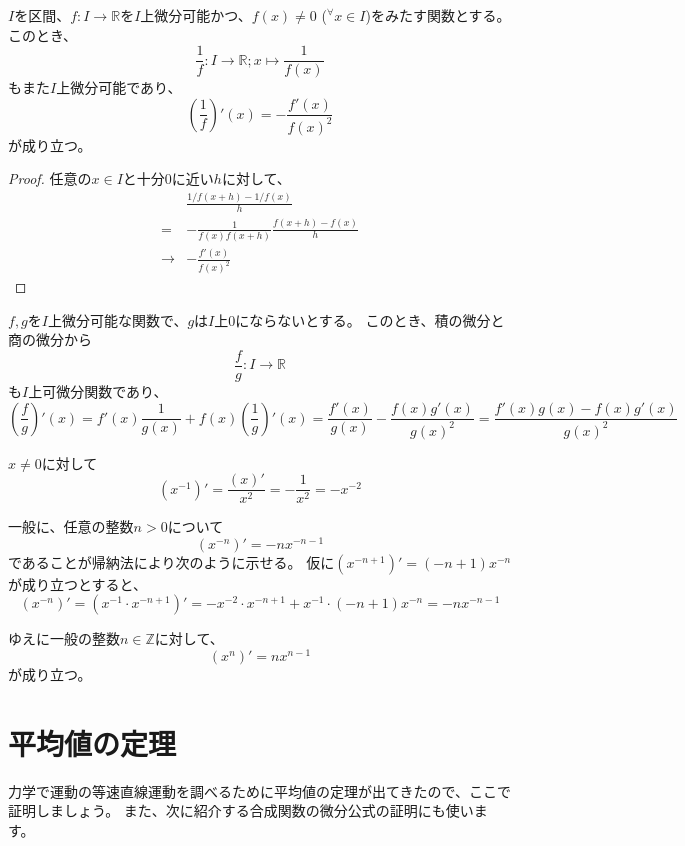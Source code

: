 \begin{theorem}
  $I$を区間、$f:I\to\mathbb{R}$を$I$上微分可能かつ、$f(x)\neq0$ (${}^\forall x\in I$)をみたす関数とする。
  このとき、
  \[
    \frac{1}{f}:I\to\mathbb{R};x\mapsto\frac{1}{f(x)}
  \]
  もまた$I$上微分可能であり、
  \[
    \left(\frac{1}{f}\right)'(x)=-\frac{f'(x)}{f(x)^2}
  \]
  が成り立つ。
\end{theorem}
\begin{proof}
  任意の$x\in I$と十分0に近い$h$に対して、
  \begin{align*}
    &\frac{1/f(x+h)-1/f(x)}{h}\\
    =&-\frac{1}{f(x)f(x+h)}\frac{f(x+h)-f(x)}{h}\\
    \to&-\frac{f'(x)}{f(x)^2}
  \end{align*}
\end{proof}

\begin{example}
  $f,g$を$I$上微分可能な関数で、$g$は$I$上0にならないとする。
  このとき、積の微分と商の微分から
  \[
    \frac{f}{g}:I\to\mathbb{R}
  \]
  も$I$上可微分関数であり、
  \[
    \left(\frac{f}{g}\right)'(x)=f'(x)\frac{1}{g(x)}+f(x)\left(\frac{1}{g}\right)'(x)=\frac{f'(x)}{g(x)}-\frac{f(x)g'(x)}{g(x)^2}=\frac{f'(x)g(x)-f(x)g'(x)}{g(x)^2}
  \]
\end{example}

\begin{example}
  $x\neq0$に対して
  \[
    (x^{-1})'=\frac{(x)'}{x^2}=-\frac{1}{x^2}=-x^{-2}
  \]

  一般に、任意の整数$n>0$について
  \[
    (x^{-n})'=-nx^{-n-1}
  \]
  であることが帰納法により次のように示せる。
  仮に$(x^{-n+1})'=(-n+1)x^{-n}$が成り立つとすると、
  \[
    (x^{-n})'=(x^{-1}\cdot x^{-n+1})'=-x^{-2}\cdot x^{-n+1}+x^{-1}\cdot(-n+1)x^{-n}=-nx^{-n-1}
  \]

  ゆえに一般の整数$n\in\mathbb{Z}$に対して、
  \[
    (x^n)'=nx^{n-1}
  \]
  が成り立つ。
\end{example}



\section{平均値の定理}\label{sec:mean-value-theorem}

力学で運動の等速直線運動を調べるために平均値の定理が出てきたので、ここで証明しましょう。
また、次に紹介する合成関数の微分公式の証明にも使います。

